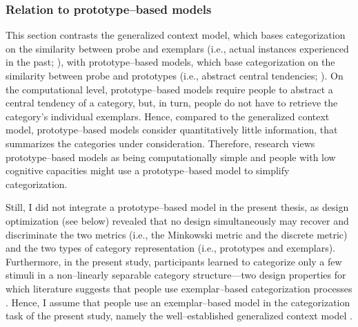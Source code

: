 \documentclass[a4paper,man,natbib]{apa6}
\begin{document}
\subsubsection{Relation to prototype--based models}
This section contrasts the generalized context model, which bases categorization on the similarity between probe and exemplars (i.e., actual instances experienced in the past; \citealp{medin1978context, nosofsky1986attention}), with prototype--based models, which base categorization on the similarity between probe and prototypes (i.e., abstract central tendencies; \citealp{posner1968genesis}). 
On the computational level, prototype--based models require people to abstract a central tendency of a category, but, in turn, people do not have to retrieve the category's individual exemplars. Hence, compared to the generalized context model, prototype--based models consider quantitatively little information, that summarizes the categories under consideration. Therefore, research views prototype--based models as being computationally simple \citep{smith1998prototypes} and people with low cognitive capacities might use a prototype--based model to simplify categorization. 

Still, I did not integrate a prototype--based model in the present thesis, as design optimization (see below) revealed that no design simultaneously may recover and discriminate the two metrics (i.e., the Minkowski metric and the discrete metric) and the two types of category representation (i.e., prototypes and exemplars). Furthermore, in the present study, participants learned to categorize only a few stimuli in a non--linearly separable category structure---two design properties for which literature suggests that people use exemplar--based categorization processes \citep{smith1998prototypes, smith2000thirty}. Hence, I assume that people use an exemplar--based model in the categorization task of the present study, namely the well--established generalized context model \citep{nosofsky1986attention}.
\end{document}
